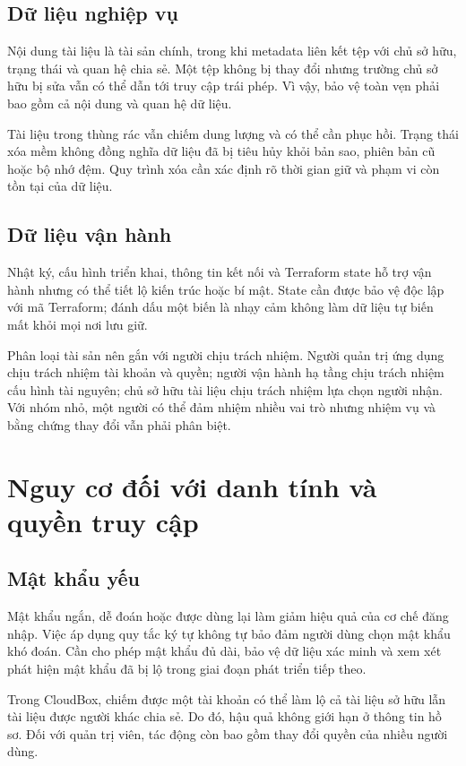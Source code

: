 \subsection{Dữ liệu nghiệp vụ}
Nội dung tài liệu là tài sản chính, trong khi metadata liên kết tệp với chủ sở hữu, trạng thái và quan hệ chia sẻ. Một tệp không bị thay đổi nhưng trường chủ sở hữu bị sửa vẫn có thể dẫn tới truy cập trái phép. Vì vậy, bảo vệ toàn vẹn phải bao gồm cả nội dung và quan hệ dữ liệu.

Tài liệu trong thùng rác vẫn chiếm dung lượng và có thể cần phục hồi. Trạng thái xóa mềm không đồng nghĩa dữ liệu đã bị tiêu hủy khỏi bản sao, phiên bản cũ hoặc bộ nhớ đệm. Quy trình xóa cần xác định rõ thời gian giữ và phạm vi còn tồn tại của dữ liệu.
\subsection{Dữ liệu vận hành}
Nhật ký, cấu hình triển khai, thông tin kết nối và Terraform state hỗ trợ vận hành nhưng có thể tiết lộ kiến trúc hoặc bí mật. State cần được bảo vệ độc lập với mã Terraform; đánh dấu một biến là nhạy cảm không làm dữ liệu tự biến mất khỏi mọi nơi lưu giữ.

Phân loại tài sản nên gắn với người chịu trách nhiệm. Người quản trị ứng dụng chịu trách nhiệm tài khoản và quyền; người vận hành hạ tầng chịu trách nhiệm cấu hình tài nguyên; chủ sở hữu tài liệu chịu trách nhiệm lựa chọn người nhận. Với nhóm nhỏ, một người có thể đảm nhiệm nhiều vai trò nhưng nhiệm vụ và bằng chứng thay đổi vẫn phải phân biệt.

\section{Nguy cơ đối với danh tính và quyền truy cập}
\subsection{Mật khẩu yếu}
Mật khẩu ngắn, dễ đoán hoặc được dùng lại làm giảm hiệu quả của cơ chế đăng nhập. Việc áp dụng quy tắc ký tự không tự bảo đảm người dùng chọn mật khẩu khó đoán. Cần cho phép mật khẩu đủ dài, bảo vệ dữ liệu xác minh và xem xét phát hiện mật khẩu đã bị lộ trong giai đoạn phát triển tiếp theo.

Trong CloudBox, chiếm được một tài khoản có thể làm lộ cả tài liệu sở hữu lẫn tài liệu được người khác chia sẻ. Do đó, hậu quả không giới hạn ở thông tin hồ sơ. Đối với quản trị viên, tác động còn bao gồm thay đổi quyền của nhiều người dùng.
